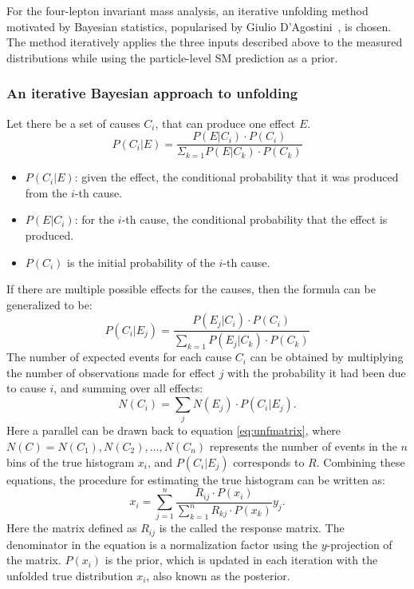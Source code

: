 For the four-lepton invariant mass analysis, an iterative unfolding method motivated by Bayesian statistics, popularised by Giulio D’Agostini~\cite{DAGOSTINI1995487}, is chosen. The method iteratively applies the three inputs described above to the measured distributions while using the particle-level SM prediction as a prior.

\subsubsection{An iterative Bayesian approach to unfolding}
\label{ssec:bayesianunfolding}
Let there be a set of causes $C_i$, that can produce one effect $E$. 
\begin{equation}
    P(C_i|E)=\dfrac{P(E|C_i)\cdot P(C_i)}{\Sigma_{k=1}P(E|C_k)\cdot P(C_k)}
\end{equation}

\begin{itemize}
    \item $P(C_i|E)$: given the effect, the conditional probability that it was produced from the $i$-th cause.
    \item $P(E|C_i)$: for the $i$-th cause, the conditional probability that the effect is produced.
    \item $P(C_i)$ is the initial probability of the $i$-th cause.
\end{itemize}
If there are multiple possible effects for the causes, then the formula can be generalized to be:
\begin{equation}
    P(C_i|E_j)=\dfrac{P(E_j|C_i)\cdot P(C_i)}{\sum_{k=1}P(E_j|C_k)\cdot P(C_k)}
\end{equation}
The number of expected events for each cause $C_i$ can be obtained by multiplying the number of observations made for effect $j$ with the probability it had been due to cause $i$, and summing over all effects:
\begin{equation} \label{eq:numcause}
    N(C_i)=\sum_jN(E_j)\cdot P(C_i|E_j).
\end{equation}
Here a parallel can be drawn back to equation \ref{eq:unfmatrix}, where $N(C)={N(C_1),N(C_2),...,N(C_n)}$ represents the number of events in the $n$ bins of the true histogram $x_i$, and $P(C_i|E_j)$ corresponds to $R$. Combining these equations, the procedure for estimating the true histogram can be written as:
\begin{equation}\label{eq:bayesianunfolding}
    x_i=\sum_{j=1}^n\dfrac{R_{ij}\cdot P(x_i)}{\sum_{k=1}^nR_{kj}\cdot P(x_k)}y_j.
\end{equation}
Here the matrix defined as $R_{ij}$ is the called the response matrix. The denominator in the equation is a normalization factor using the $y$-projection of the matrix. $P(x_i)$ is the prior, which is updated in each iteration with the unfolded true distribution $x_i$, also known as the posterior.

